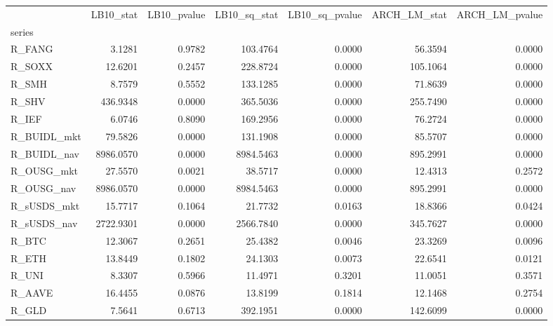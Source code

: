 \begin{tabular}{lrrrrrr}
\toprule
 & LB10\_stat & LB10\_pvalue & LB10\_sq\_stat & LB10\_sq\_pvalue & ARCH\_LM\_stat & ARCH\_LM\_pvalue \\
series &  &  &  &  &  &  \\
\midrule
R\_FANG & 3.1281 & 0.9782 & 103.4764 & 0.0000 & 56.3594 & 0.0000 \\
R\_SOXX & 12.6201 & 0.2457 & 228.8724 & 0.0000 & 105.1064 & 0.0000 \\
R\_SMH & 8.7579 & 0.5552 & 133.1285 & 0.0000 & 71.8639 & 0.0000 \\
R\_SHV & 436.9348 & 0.0000 & 365.5036 & 0.0000 & 255.7490 & 0.0000 \\
R\_IEF & 6.0746 & 0.8090 & 169.2956 & 0.0000 & 76.2724 & 0.0000 \\
R\_BUIDL\_mkt & 79.5826 & 0.0000 & 131.1908 & 0.0000 & 85.5707 & 0.0000 \\
R\_BUIDL\_nav & 8986.0570 & 0.0000 & 8984.5463 & 0.0000 & 895.2991 & 0.0000 \\
R\_OUSG\_mkt & 27.5570 & 0.0021 & 38.5717 & 0.0000 & 12.4313 & 0.2572 \\
R\_OUSG\_nav & 8986.0570 & 0.0000 & 8984.5463 & 0.0000 & 895.2991 & 0.0000 \\
R\_sUSDS\_mkt & 15.7717 & 0.1064 & 21.7732 & 0.0163 & 18.8366 & 0.0424 \\
R\_sUSDS\_nav & 2722.9301 & 0.0000 & 2566.7840 & 0.0000 & 345.7627 & 0.0000 \\
R\_BTC & 12.3067 & 0.2651 & 25.4382 & 0.0046 & 23.3269 & 0.0096 \\
R\_ETH & 13.8449 & 0.1802 & 24.1303 & 0.0073 & 22.6541 & 0.0121 \\
R\_UNI & 8.3307 & 0.5966 & 11.4971 & 0.3201 & 11.0051 & 0.3571 \\
R\_AAVE & 16.4455 & 0.0876 & 13.8199 & 0.1814 & 12.1468 & 0.2754 \\
R\_GLD & 7.5641 & 0.6713 & 392.1951 & 0.0000 & 142.6099 & 0.0000 \\
\bottomrule
\end{tabular}
